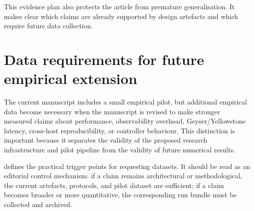 \documentclass[11pt,a4paper]{article}
\begin{document}
This evidence plan also protects the article from premature generalisation. It makes clear which claims are already supported by design artefacts and which require future data collection.

\section{Data requirements for future empirical extension}
\label{sec:data-requirements}

The current manuscript includes a small empirical pilot, but additional empirical data become necessary when the manuscript is revised to make stronger measured claims about performance, observability overhead, Geyser/Yellowstone latency, cross-host reproducibility, or controller behaviour. This distinction is important because it separates the validity of the proposed research infrastructure and pilot pipeline from the validity of future numerical results.

 defines the practical trigger points for requesting datasets. It should be read as an editorial control mechanism: if a claim remains architectural or methodological, the current artefacts, protocols, and pilot dataset are sufficient; if a claim becomes broader or more quantitative, the corresponding run bundle must be collected and archived.
\end{document}
